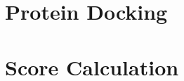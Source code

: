 \documentclass[11pt]{article}
\begin{document}
\date{\today}

\section{Protein Docking}


\section{Score Calculation}
\begin{lstlisting}

\end{lstlisting}
\end{document}
